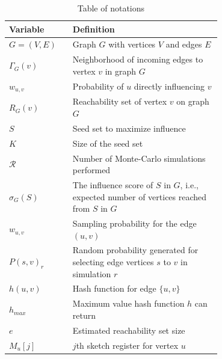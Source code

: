 \documentclass[10pt,journal,compsoc]{IEEEtran}
\begin{document}
\begin{table}[!ht]
    \caption{Table of notations}
    \label{tab:notation}
    \centering
    \begin{tabular}{|l|p{0.7\linewidth}|}
        \hline
        Variable & Definition  \\
        \hline
        $G = (V,E)$     & Graph $G$ with vertices $V$ and edges $E$ \\
        $\Gamma_G(v)$   & Neighborhood of incoming edges to vertex $v$ in graph $G$\\ %
        $w_{u,v}$       & Probability of $u$ directly influencing $v$ \\
        $R_{G}(v)$      & Reachability set of vertex $v$ on graph $G$\\
        \hline\hline
        $S$             & Seed set to maximize influence\\
        $K$             & Size of the seed set\\
        $\mathcal{R}$   & Number of Monte-Carlo simulations performed\\
        $\sigma_{G}(S)$ & The influence score of $S$ in $G$, i.e., expected number of vertices reached from $S$ in $G$\\
        \hline\hline
        $w_{u,v}$             & Sampling probability for the edge $(u,v)$\\
        $P(s,v)_r $     & Random probability generated for selecting edge vertices $s$ to $v$ in simulation $r$\\
        $h(u,v)$        & Hash function for edge $\{u,v\}$\\
        $h_{max}$       & Maximum value hash function $h$ can return\\
        \hline\hline
        $e$             & Estimated reachability set size\\
        $M_u[j]$        & $j$th sketch register for vertex $u$\\

\end{tabular}
\end{table}
\end{document}
